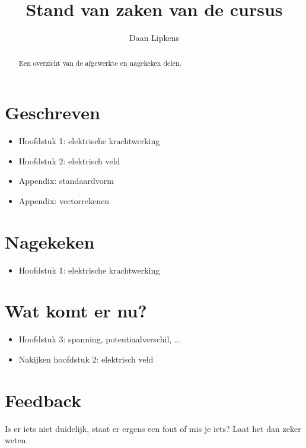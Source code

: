 \documentclass{ximera}
\title{Stand van zaken van de cursus}
\author{Daan Lipkens}
\begin{document}
\begin{abstract}
    Een overzicht van de afgewerkte en nagekeken delen.
\end{abstract}
\maketitle

\section*{Geschreven}
\begin{itemize}
    \item Hoofdstuk 1: elektrische krachtwerking
    \item Hoofdstuk 2: elektrisch veld
    \item Appendix: standaardvorm
    \item Appendix: vectorrekenen
\end{itemize}

\section*{Nagekeken}
\begin{itemize}
    \item Hoofdstuk 1: elektrische krachtwerking
\end{itemize}

\section*{Wat komt er nu?}
\begin{itemize}
    \item Hoofdstuk 3: spanning, potentiaalverschil, ...
    \item Nakijken hoofdstuk 2: elektrisch veld
\end{itemize}

\section*{Feedback}
Is er iets niet duidelijk, staat er ergens een fout of mis je iets? Laat het dan zeker weten.
\end{document}
